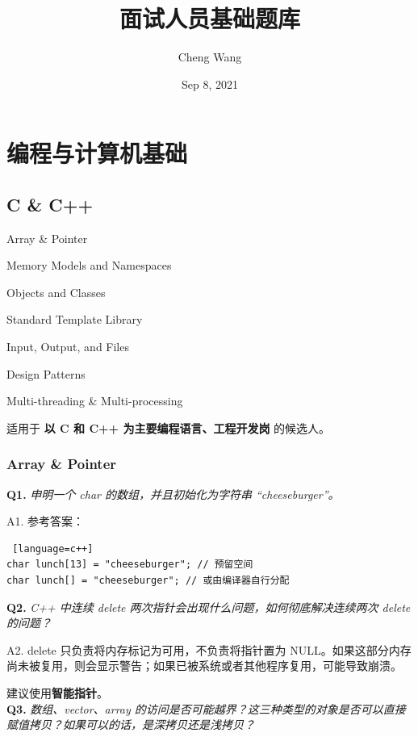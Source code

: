 \documentclass[cn,10pt,math=newtx,citestyle=gb7714-2015,bibstyle=gb7714-2015]{elegantbook}
\title{面试人员基础题库}
\author{Cheng Wang}
\date{Sep 8, 2021}
\begin{document}
\maketitle
\frontmatter

\tableofcontents

\mainmatter

\chapter{编程与计算机基础}

\section{C \& C++}

\begin{introduction}
\item Array \& Pointer
\item Memory Models and Namespaces
\item Objects and Classes
\item Standard Template Library
\item Input, Output, and Files
\item Design Patterns
\item Multi-threading \& Multi-processing
\end{introduction}

适用于 \textbf{以 C 和 C++ 为主要编程语言、工程开发岗}  的候选人。

\subsection{Array \& Pointer}
\textbf{Q1.} \textit{申明一个 char 的数组，并且初始化为字符串 ``cheeseburger''。}

A1. 参考答案：
\begin{lstlisting} [language=c++]
char lunch[13] = "cheeseburger"; // 预留空间
char lunch[] = "cheeseburger"; // 或由编译器自行分配
\end{lstlisting}


\textbf{Q2.} \textit{C++ 中连续 delete 两次指针会出现什么问题，如何彻底解决连续两次 delete 的问题？}

A2. delete 只负责将内存标记为可用，不负责将指针置为 NULL。如果这部分内存尚未被复用，则会显示警告；如果已被系统或者其他程序复用，可能导致崩溃。

建议使用\textbf{智能指针}。\\


\textbf{Q3.} \textit{数组、vector、array 的访问是否可能越界？这三种类型的对象是否可以直接赋值拷贝？如果可以的话，是深拷贝还是浅拷贝？}
\end{document}
